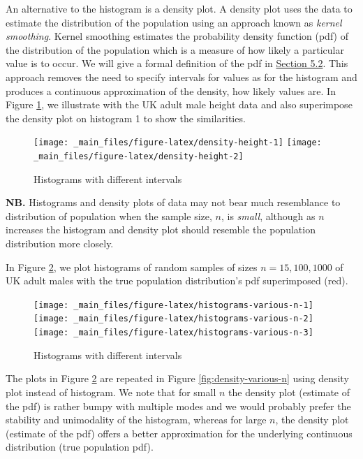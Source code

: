 \documentclass[
]{book}
\begin{document}
An alternative to the histogram is a density plot. A density plot uses the data to estimate the distribution of the population using an approach known as \emph{kernel smoothing}. Kernel smoothing estimates the probability density function (pdf) of the distribution of the population which is a measure of how likely a particular value is to occur. We will give a formal definition of the pdf in \protect\hyperlink{rv_des}{Section 5.2}.
This approach removes the need to specify intervals for values as for the histogram and produces a continuous approximation of the density, how likely values are. In Figure \ref{fig:density-height}, we illustrate with the UK adult male height data and also superimpose the density plot on histogram 1 to show the similarities.

\begin{figure}
\texttt{[image: \_main\_files/figure-latex/density-height-1]} \texttt{[image: \_main\_files/figure-latex/density-height-2]} \caption{Histograms with different intervals}\label{fig:density-height}
\end{figure}

\textbf{NB.} Histograms and density plots of data may not bear much resemblance to distribution
of population when the sample size, \(n\), is \emph{small}, although as \(n\)
increases the histogram and density plot should resemble the population distribution
more closely.

In Figure \ref{fig:histograms-various-n}, we plot histograms of random samples of sizes \(n = 15, 100, 1000\) of UK adult males with the true population distribution's pdf superimposed (red).

\begin{figure}
\texttt{[image: \_main\_files/figure-latex/histograms-various-n-1]} \texttt{[image: \_main\_files/figure-latex/histograms-various-n-2]} \texttt{[image: \_main\_files/figure-latex/histograms-various-n-3]} \caption{Histograms with different intervals}\label{fig:histograms-various-n}
\end{figure}

The plots in Figure \ref{fig:histograms-various-n} are repeated in Figure \ref{fig:density-various-n} using density plot instead of histogram. We note that for small \(n\) the density plot (estimate of the pdf) is rather bumpy with multiple modes and we would probably prefer the stability and unimodality of the histogram, whereas for large \(n\), the density plot (estimate of the pdf) offers a better approximation for the underlying continuous distribution (true population pdf).
\end{document}
